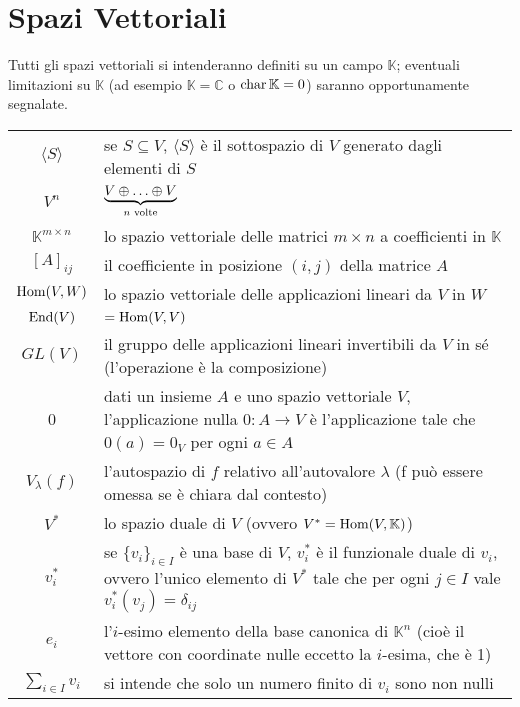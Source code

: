 \section{Spazi Vettoriali}
Tutti gli spazi vettoriali si intenderanno definiti su un campo $\mathbb{K}$; eventuali limitazioni su $\mathbb{K}$ (ad esempio $\mathbb{K}=\mathbb{C}$ o $\operatorname{char}\mathbb{K}=0$) saranno opportunamente segnalate.\\
\begin{tabularx}{\textwidth}{SX}
\hline
$\langle S\rangle$ & se $S\subseteq V$, $\langle S\rangle$ è il sottospazio di $V$ generato dagli elementi di $S$ \\
$V^n$ & $\underbrace{V\oplus\ldots\oplus V}_\text{$n$ volte}$\\
$\mathbb{K}^{m\times n}$ & lo spazio vettoriale delle matrici $m\times n$ a coefficienti in $\mathbb{K}$\\
$[A]_{ij}$ & il coefficiente in posizione $(i,j)$ della matrice $A$\\
$\operatorname{Hom}(V,W)$ & lo spazio vettoriale delle applicazioni lineari da $V$ in $W$\\
$\operatorname{End}(V)$ & $=\operatorname{Hom}(V,V)$ \\
$GL(V)$ & il gruppo delle applicazioni lineari invertibili da $V$ in sé (l'operazione è la composizione) \\
0 & dati un insieme $A$ e uno spazio vettoriale $V$, l'applicazione nulla $0:A\to V$ è l'applicazione tale che $0(a)=0_V$ per ogni $a\in A$ \\
$V_\lambda(f)$ & l'autospazio di $f$ relativo all'autovalore $\lambda$ (f può essere omessa se è chiara dal contesto)\\
$V^*$ & lo spazio duale di $V$ (ovvero $V^*=\operatorname{Hom}(V,\mathbb{K})$) \\
$v_i^*$ & se $\{v_i\}_{i\in I}$ è una base di $V$, $v_i^*$ è il funzionale duale di $v_i$, ovvero l'unico elemento di $V^*$ tale che per ogni $j\in I$ vale $v_i^*(v_{j})=\delta_{ij}$\\
$e_i$ & l'$i$-esimo elemento della base canonica di $\mathbb{K}^n$ (cioè il vettore con coordinate nulle eccetto la $i$-esima, che è 1)\\
$\sum_{i\in I}v_i$ & si intende che solo un numero finito di $v_i$ sono non nulli\\
\hline
\end{tabularx}
